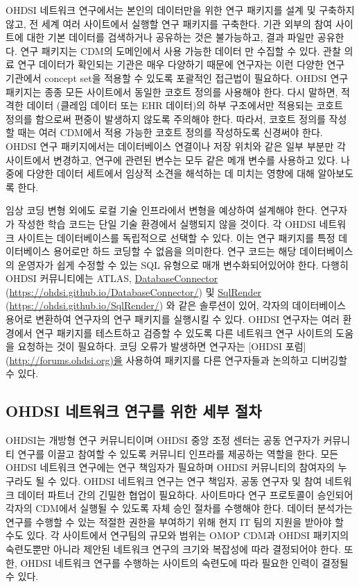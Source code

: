 \documentclass[11pt]{book}
\theoremstyle{definition}
\theoremstyle{definition}
\theoremstyle{definition}
\theoremstyle{remark}
\begin{document}
OHDSI 네트워크 연구에서는 본인의 데이터만을 위한 연구 패키지를 설계 및
구축하지 않고, 전 세계 여러 사이트에서 실행할 연구 패키지를 구축한다.
기관 외부의 참여 사이트에 대한 기본 데이터를 검색하거나 공유하는 것은
불가능하고, 결과 파일만 공유한다. 연구 패키지는 CDM의 도메인에서 사용
가능한 데이터 만 수집할 수 있다. 관찰 의료 연구 데이터가 확인되는 기관은
매우 다양하기 때문에 연구자는 이런 다양한 연구 기관에서 concept set을
적용할 수 있도록 포괄적인 접근법이 필요하다. OHDSI 연구 패키지는 종종
모든 사이트에서 동일한 코호트 정의를 사용해야 한다. 다시 말하면, 적격한
데이터 (클레임 데이터 또는 EHR 데이터)의 하부 구조에서만 적용되는 코호트
정의를 함으로써 편중이 발생하지 않도록 주의해야 한다. 따라서, 코호트
정의를 작성할 때는 여러 CDM에서 적용 가능한 코호트 정의를 작성하도록
신경써야 한다. OHDSI 연구 패키지에서는 데이터베이스 연결이나 저장 위치와
같은 일부 부분만 각 사이트에서 변경하고, 연구에 관련된 변수는 모두 같은
메개 변수를 사용하고 있다. 나중에 다양한 데이터 세트에서 임상적 소견을
해석하는 데 미치는 영향에 대해 알아보도록 한다.

임상 코딩 변형 외에도 로컬 기술 인프라에서 변형을 예상하여 설계해야
한다. 연구자가 작성한 학습 코드는 단일 기술 환경에서 실행되지 않을
것이다. 각 OHDSI 네트워크 사이트는 데이터베이스를 독립적으로 선택할 수
있다. 이는 연구 패키지를 특정 데이터베이스 용어로만 하드 코딩할 수
없음을 의미한다. 연구 코드는 해당 데이터베이스의 운영자가 쉽게 수정할 수
있는 SQL 유형으로 매개 변수화되어있어야 한다. 다행히 OHDSI 커뮤니티에는
ATLAS, \protect\hyperlink{DatabaseConnector}{DatabaseConnector}
(\url{https://ohdsi.github.io/DatabaseConnector/}) 및
\protect\hyperlink{SqlRender}{SqlRender}
(\url{https://ohdsi.github.io/SqlRender/}) 와 같은 솔루션이 있어, 각자의
데이터베이스 용어로 변환하여 연구자의 연구 패키지를 실행시킬 수 있다.
OHDSI 연구자는 여러 환경에서 연구 패키지를 테스트하고 검증할 수 있도록
다른 네트워크 연구 사이트의 도움을 요청하는 것이 필요하다. 코딩 오류가
발생하면 연구자는 {[}OHDSI 포럼{]} (\url{http://forums.ohdsi.org)을}
사용하여 패키지를 다른 연구자들과 논의하고 디버깅할 수 있다.

\subsection{OHDSI 네트워크 연구를 위한 세부 절차}\label{ohdsi-----}


OHDSI는 개방형 연구 커뮤니티이며 OHDSI 중앙 조정 센터는 공동 연구자가
커뮤니티 연구를 이끌고 참여할 수 있도록 커뮤니티 인프라를 제공하는
역할을 한다. 모든 OHDSI 네트워크 연구에는 연구 책임자가 필요하며 OHDSI
커뮤니티의 참여자의 누구라도 될 수 있다. OHDSI 네트워크 연구는 연구
책임자, 공동 연구자 및 참여 네트워크 데이터 파트너 간의 긴밀한 협업이
필요하다. 사이트마다 연구 프로토콜이 승인되어 각자의 CDM에서 실행될 수
있도록 자체 승인 절차를 수행해야 한다. 데이터 분석가는 연구를 수행할 수
있는 적절한 권한을 부여하기 위해 현지 IT 팀의 지원을 받아야 할 수도
있다. 각 사이트에서 연구팀의 규모와 범위는 OMOP CDM과 OHDSI 패키지의
숙련도뿐만 아니라 제안된 네트워크 연구의 크기와 복잡성에 따라 결정되어야
한다. 또한, OHDSI 네트워크 연구를 수행하는 사이트의 숙련도에 따라 필요한
인력이 결정될 수 있다.
\end{document}
